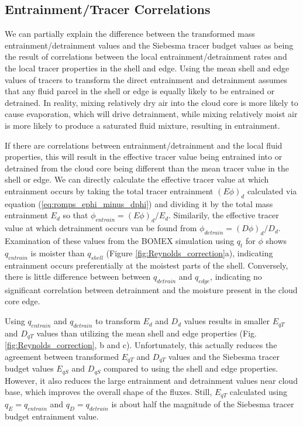 \documentclass[12pt]{article}
\begin{document}

\subsection{Entrainment/Tracer Correlations}

We can partially explain the difference between the transformed mass 
entrainment/detrainment values and the Siebesma tracer budget values as 
being the result of correlations between the local entrainment/detrainment 
rates and the local tracer properties in the shell and edge.  Using the 
mean shell and edge values of tracers to transform the direct entrainment 
and detrainment assumes that any fluid parcel in the shell or edge is 
equally likely to be entrained or detrained.  In reality, mixing relatively 
dry air into the cloud core is more likely to cause evaporation, which will 
drive detrainment, while mixing relatively moist air is more likely to 
produce a saturated fluid mixture, resulting in entrainment.

If there are correlations between entrainment/detrainment and the local 
fluid properties, this will result in the effective tracer value being 
entrained into or detrained from the cloud core being different than the 
mean tracer value in the shell or edge.  We can directly calculate the 
effective tracer value at which entrainment occurs by taking the total 
tracer entrainment $(E\phi)_d$ calculated via equation 
(\ref{eq:romps_ephi_minus_dphi}) and dividing it by the total mass
entrainment $E_d$ so that $\phi_{entrain} = (E\phi)_d / E_d$.  Similarily, 
the effective tracer value at which detrainment occurs van be found from  
$\phi_{detrain} = (D\phi)_d / D_d$.  Examination of these values from the 
BOMEX simulation using $q_t$ for $\phi$ shows $q_{entrain}$ is moister than 
$q_{shell}$ (Figure \ref{fig:Reynolds_correction}a), indicating entrainment
occurs preferentially at the moistest parts of the shell.  Conversely, 
there is little difference between between $q_{detrain}$ and $q_{edge}$,
indicating no significant correlation between detrainment and the moisture
present in the cloud core edge.

Using $q_{entrain}$ and $q_{detrain}$ to transform $E_d$ and $D_d$ values 
results in smaller $E_{q T}$ and $D_{q T}$ values than utilizing the mean 
shell and edge properties (Fig. \ref{fig:Reynolds_correction}, b and c).  
Unfortunately, this actually reduces the agreement between transformed 
$E_{q T}$ and $D_{q T}$ values and the Siebesma tracer budget values 
$E_{q S}$ and $D_{q S}$ compared to using the shell and edge properties.
 However, it also reduces the large entrainment and detrainment values near 
cloud base, which improves the overall shape of the fluxes.  Still, 
$E_{q T}$ calculated using $q_E = q_{entrain}$ and $q_D = q_{detrain}$ is 
about half the magnitude of the Siebesma tracer budget entrainment value.
\end{document}
